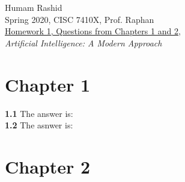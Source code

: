\documentclass{scrartcl}
\begin{document}
\begin{flushleft}
Humam Rashid\\
Spring 2020, CISC 7410X, Prof. Raphan\\
\underline{Homework 1, Questions from Chapters 1 and 2,}\\
\textit{Artificial Intelligence: A Modern Approach}
\end{flushleft}

\section*{Chapter 1}
\textbf{1.1} The answer is:
\\
\textbf{1.2} The asnwer is:

\section*{Chapter 2}
\end{document}
